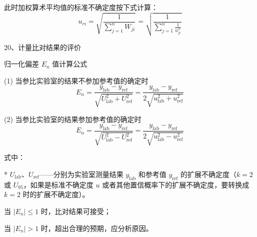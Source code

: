\documentclass[UTF8]{ctexart}
\begin{document}
此时加权算术平均值的标准不确定度按下式计算：
\[
u_{ri} = \sqrt{\frac{1}{\sum_{j=1}^{n} W_{ji}}} = \sqrt{\frac{1}{\sum_{j=1}^{n} \frac{1}{u_{ji}^2}}}
\]

\vspace{5mm} 
20、计量比对结果的评价

归一化偏差 \(E_n\) 值计算公式

(1) 当参比实验室的结果不参加参考值的确定时
\[
E_n = \frac{y_{\text{lab}} - y_{\text{ref}}}{\sqrt{U_{\text{lab}}^2 + U_{\text{ref}}^2}} = \frac{y_{\text{lab}} - y_{\text{ref}}}{2\sqrt{u_{\text{lab}}^2 + u_{\text{ref}}^2}}
\]

(2) 当参比实验室的结果参加参考值的确定时
\[
E_n = \frac{y_{\text{lab}} - y_{\text{ref}}}{\sqrt{U_{\text{lab}}^2 - U_{\text{ref}}^2}} = \frac{y_{\text{lab}} - y_{\text{ref}}}{2\sqrt{u_{\text{lab}}^2 - u_{\text{ref}}^2}}
\]

式中：

*   \(U_{\text{lab}}\)、\(U_{\text{ref}}\)——分别为实验室测量结果 \(y_{\text{lab}}\) 和参考值 \(y_{\text{ref}}\) 的扩展不确定度（\(k=2\) 或 \(U_{95}\)，如果是标准不确定度 \(u\) 或者其他置信概率下的扩展不确定度，要转换成 \(k=2\) 时的扩展不确定度）。

当 \(|E_n| \le 1\) 时，比对结果可接受；

当 \(|E_n| > 1\) 时，超出合理的预期，应分析原因。
\end{document}
